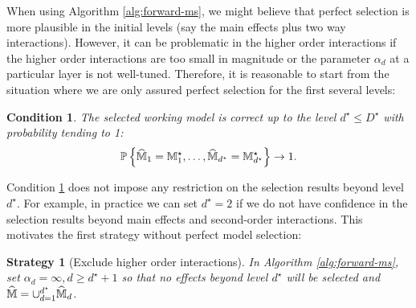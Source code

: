 \documentclass[12pt]{article}
\newtheorem{condition}{Condition}
\newtheorem{strategy}{Strategy}
\begin{document}
When using Algorithm \ref{alg:forward-ms}, we might believe that perfect selection is more plausible in the initial levels (say the main effects plus two way interactions). However, it can be problematic in the higher order interactions if the higher order interactions are too small in magnitude or the parameter $\alpha_d$ at a particular layer is not well-tuned. Therefore, it is reasonable to start from the situation where we are only assured perfect selection for the first several levels:
\begin{condition}\label{cond:under-selection}
The selected working model is correct up to the level $d^\star \le D^\star$ with  probability tending to 1:
\begin{align*}
    {{\mathbb{P}}\left\{\widehat{{\mathbb{M}}}_1 = {\mathbb{M}}^\star_1, \dots, \widehat{{\mathbb{M}}}_{d^\star} = {\mathbb{M}}^\star_{d^\star}\right\}} \to 1. 
\end{align*}
\end{condition}

Condition \ref{cond:under-selection} does not impose any restriction on the selection results beyond level $d^\star$. For example, in practice we can set $d^\star = 2$ if we do not have confidence in the selection results beyond main effects and second-order interactions. This motivates the first strategy without perfect model selection:

\begin{strategy}[Exclude higher order interactions]\label{str:exclude-all}
 In Algorithm \ref{alg:forward-ms}, set $\alpha_d = \infty,d\ge d^\star + 1$ so that no effects beyond level $d^\star$ will be selected and $\widehat{{\mathbb{M}}} = \cup_{d=1}^{d^\star}\widehat{{\mathbb{M}}}_{d}$. 
\end{strategy}
\end{document}
